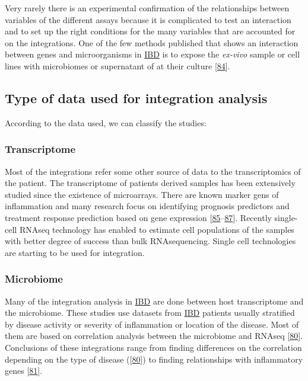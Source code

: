 \documentclass[
  12pt,
  a4paper,
  twoside,
  openright]{book}
\begin{document}
Very rarely there is an experimental confirmation of the relationships between variables of the different assays because it is complicated to test an interaction and to set up the right conditions for the many variables that are accounted for on the integrations.
One of the few methods published that shows an interaction between genes and microorganisms in \protect\hyperlink{acronyms_IBD}{IBD} is to expose the \emph{ex-vivo} sample or cell lines with microbiomes or supernatant of at their culture {[}\protect\hyperlink{ref-mayorgas2021}{84}{]}.

\hypertarget{data-origin}{%
\subsection{Type of data used for integration analysis}\label{data-origin}}

According to the data used, we can classify the studies:

\hypertarget{transcriptome}{%
\subsubsection{Transcriptome}\label{transcriptome}}

Most of the integrations refer some other source of data to the transcriptomics of the patient.
The transcriptome of patients derived samples has been extensively studied since the existence of microarrays.
There are known marker gens of inflammation and many research focus on identifying prognosis predictors and treatment response prediction based on gene expression {[}\protect\hyperlink{ref-planell2013}{85}--\protect\hyperlink{ref-massimino2021}{87}{]}.
Recently single-cell RNAseq technology has enabled to estimate cell populations of the samples with better degree of success than bulk RNAsequencing.
Single cell technologies are starting to be used for integration.

\hypertarget{microbiome-1}{%
\subsubsection{Microbiome}\label{microbiome-1}}

Many of the integration analysis in \protect\hyperlink{acronyms_IBD}{IBD} are done between host transcriptome and the microbiome.
These studies use datasets from \protect\hyperlink{acronyms_IBD}{IBD} patients usually stratified by disease activity or severity of inflammation or location of the disease.
Most of them are based on correlation analysis between the microbiome and RNAseq {[}\protect\hyperlink{ref-hasler_uncoupling_2016}{80}{]}.
Conclusions of these integrations range from finding differences on the correlation depending on the type of disease ({[}\protect\hyperlink{ref-hasler_uncoupling_2016}{80}{]}) to finding relationships with inflammatory genes {[}\protect\hyperlink{ref-tang2017}{81}{]}.
\end{document}
